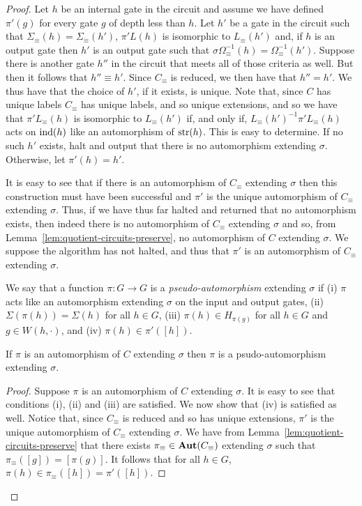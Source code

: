 \documentclass[../main/thesis.tex]{subfiles}
\begin{document}
\begin{proof}
  Let $h$ be an internal gate in the circuit and assume we have defined
  $\pi'(g)$ for every gate $g$ of depth less than $h$. Let $h'$ be a gate in the
  circuit such that $\Sigma_\equiv(h) = \Sigma_\equiv (h')$, $\pi' L(h)$ is
  isomorphic to $L_\equiv(h')$ and, if $h$ is an output gate then $h'$ is an
  output gate such that $\sigma \Omega^{-1}_\equiv(h) = \Omega^{-1}_\equiv(h')$.
  Suppose there is another gate $h''$ in the circuit that meets all of those
  criteria as well. But then it follows that $h'' \equiv h'$. Since $C_\equiv$
  is reduced, we then have that $h'' = h'$. We thus have that the choice of
  $h'$, if it exists, is unique. Note that, since $C$ has unique labels
  $C_\equiv$ has unique labels, and so unique extensions, and so we have that
  $\pi' L_\equiv(h)$ is isomorphic to $L_\equiv(h')$ if, and only if,
  $L_\equiv(h')^{-1}\pi'L_\equiv(h)$ acts on $\text{\upshape ind}(h)$ like an automorphism of
  $\text{str}(h)$. This is easy to determine. If no such $h'$ exists, halt and output
  that there is no automorphism extending $\sigma$. Otherwise, let $\pi'(h) =
  h'$.

  It is easy to see that if there is an automorphism of $C_\equiv$ extending
  $\sigma$ then this construction must have been successful and $\pi'$ is the
  unique automorphism of $C_\equiv$ extending $\sigma$. Thus, if we have thus
  far halted and returned that no automorphism exists, then indeed there is no
  automorphism of $C_\equiv$ extending $\sigma$ and so, from
  Lemma~\ref{lem:quotient-circuits-preserve}, no automorphism of $C$ extending
  $\sigma$. We suppose the algorithm has not halted, and thus that $\pi'$ is an
  automorphism of $C_\equiv$ extending $\sigma$.

  We say that a function $\pi : G \rightarrow G$ is a \emph{pseudo-automorphism}
  extending $\sigma$ if (i) $\pi$ acts like an automorphism extending $\sigma$
  on the input and output gates, (ii) $\Sigma (\pi (h)) = \Sigma(h)$ for all $h
  \in G$, (iii) $\pi(h) \in H_{\pi(g)}$ for all $h \in G$ and $g \in W(h,
  \cdot)$, and (iv) $\pi (h) \in \pi'([h])$.

\begin{claim}
  If $\pi$ is an automorphism of $C$ extending $\sigma$ then $\pi$ is a
  psudo-automorphism extending $\sigma$.
\end{claim}
\begin{proof}
  Suppose $\pi$ is an automorphism of $C$ extending $\sigma$. It is easy to see
  that conditions (i), (ii) and (iii) are satisfied. We now show that (iv) is
  satisfied as well. Notice that, since $C_\equiv$ is reduced and so has unique
  extensions, $\pi'$ is the unique automorphism of $C_\equiv$ extending
  $\sigma$. We have from Lemma~\ref{lem:quotient-circuits-preserve} that there
  exists $\pi_\equiv \in \text{\textbf{Aut}}(C_\equiv)$ extending $\sigma$ such that
  $\pi_\equiv ([g]) = [\pi(g)]$. It follows that for all $h \in G$, $\pi(h) \in
  \pi_\equiv([h]) = \pi'([h])$.
\end{proof}


\end{proof}
\end{document}
